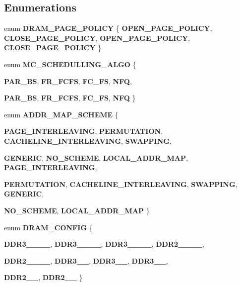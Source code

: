\subsection*{Enumerations}
\begin{CompactItemize}
\item 
enum {\bf DRAM\_\-PAGE\_\-POLICY} \{ {\bf OPEN\_\-PAGE\_\-POLICY}, 
{\bf CLOSE\_\-PAGE\_\-POLICY}, 
{\bf OPEN\_\-PAGE\_\-POLICY}, 
{\bf CLOSE\_\-PAGE\_\-POLICY}
 \}
\item 
enum {\bf MC\_\-SCHEDULLING\_\-ALGO} \{ \par
{\bf PAR\_\-BS}, 
{\bf FR\_\-FCFS}, 
{\bf FC\_\-FS}, 
{\bf NFQ}, 
\par
{\bf PAR\_\-BS}, 
{\bf FR\_\-FCFS}, 
{\bf FC\_\-FS}, 
{\bf NFQ}
 \}
\item 
enum {\bf ADDR\_\-MAP\_\-SCHEME} \{ \par
{\bf PAGE\_\-INTERLEAVING}, 
{\bf PERMUTATION}, 
{\bf CACHELINE\_\-INTERLEAVING}, 
{\bf SWAPPING}, 
\par
{\bf GENERIC}, 
{\bf NO\_\-SCHEME}, 
{\bf LOCAL\_\-ADDR\_\-MAP}, 
{\bf PAGE\_\-INTERLEAVING}, 
\par
{\bf PERMUTATION}, 
{\bf CACHELINE\_\-INTERLEAVING}, 
{\bf SWAPPING}, 
{\bf GENERIC}, 
\par
{\bf NO\_\-SCHEME}, 
{\bf LOCAL\_\-ADDR\_\-MAP}
 \}
\item 
enum {\bf DRAM\_\-CONFIG} \{ \par
{\bf DDR3\_\_\_\_}, 
{\bf DDR3\_\_\_\_}, 
{\bf DDR3\_\_\_\_}, 
{\bf DDR2\_\_\_\_}, 
\par
{\bf DDR2\_\_\_\_}, 
{\bf DDR3\_\_}, 
{\bf DDR3\_\_}, 
{\bf DDR3\_\_}, 
\par
{\bf DDR2\_\_}, 
{\bf DDR2\_\_}
 \}
\end{CompactItemize}
